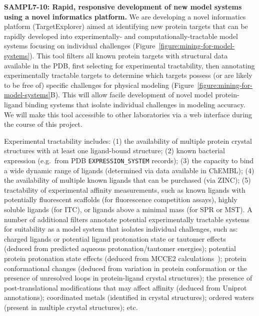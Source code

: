 \documentclass[11pt]{article}
\begin{document}
{\bf SAMPL7-10: Rapid, responsive development of new model systems using a novel informatics platform.}
We are developing a novel informatics platform (TargetExplorer) aimed at identifying new protein targets that can be rapidly developed into experimentally- and computationally-tractable model systems focusing on individual challenges (Figure~\ref{figure:mining-for-model-systems}).
This tool filters all known protein targets with structural data available in the PDB, first selecting for experimental tractability, then annotating experimentally tractable targets to determine which targets possess (or are likely to be free of) specific challenges for physical modeling (Figure~\ref{figure:mining-for-model-systems}B).
This will allow facile development of novel model protein-ligand binding systems that isolate individual challenges in modeling accuracy.
We will make this tool accessible to other laboratories via a web interface during the course of this project.

Experimental tractability includes: (1) the availability of multiple protein crystal structures with at least one ligand-bound structure; (2) known bacterial expression (e.g.~from PDB {\tt EXPRESSION\_SYSTEM} records); (3) the capacity to bind a wide dynamic range of ligands (determined via data available in ChEMBL); (4) the availability of multiple known ligands that can be purchased (via ZINC); (5) tractability of experimental affinity measurements, such as known ligands with potentially fluorescent scaffolds (for fluorescence competition assays), highly soluble ligands (for ITC), or ligands above a minimal mass (for SPR or MST).
A number of additional filters annotate potential experimentally tractable systems for suitability as a model system that isolates individual challenges, such as: charged ligands or potential ligand protonation state or tautomer effects~\cite{Martin:2009:JournalofComputer-AidedMolecularDesign} (deduced from predicted aqueous protonation/tautomer energies); potential protein protonation state effects (deduced from MCCE2 calculations~\cite{Song:2009:JournalofComputationalChemistry}); protein conformational changes (deduced from variation in protein conformation or the presence of unresolved loops in protein-ligand crystal structures); the presence of post-translational modifications that may affect affinity (deduced from Uniprot annotations); coordinated metals (identified in crystal structures); ordered waters (present in multiple crystal structures); etc.
\end{document}
